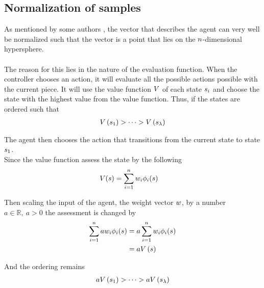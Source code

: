 \subsection{Normalization of samples \label{normalSamples}}
As mentioned by some authors \citep{boumaza2009}, the vector that
describes the agent can very well be normalized such that the vector
is a point that lies on the $n$-dimensional hypersphere.\\
\\
The reason for this lies in the nature of the evaluation function.
When the controller chooses an action, it will evaluate all the 
possible actions possible with the current piece. It will use the 
value function $V$ of each state $s_i$ and 
choose the state with the highest value from the value function.
Thus, if the states are ordered such that
\begin{align}
V \left(  s_1 \right) 
> \dots 
> V \left( s_\lambda \right)
\end{align}

The agent then chooses the action that transitions from the current state 
to state $s_1$.\\
Since the value function assess the state by the following
\begin{align}
V (s ) &= 
\sum_{i=1}^{n} w _{i}\phi _{i}(s )
\end{align}

Then scaling the input of the agent, the weight vector $w$, by a
number $a \in \mathbb{R}, \ a > 0$ the assessment is changed by
\begin{align}
\sum_{i=1}^{n} a w _{i}\phi _{i}(s ) &= 
a\sum_{i=1}^{n} w _{i}\phi _{i}(s )\\
&= a V \left( s \right)
\end{align}

And the ordering remains
\begin{align}
a V \left(  s_1 \right) 
> \dots 
> a V \left( s_\lambda \right)
\end{align}

